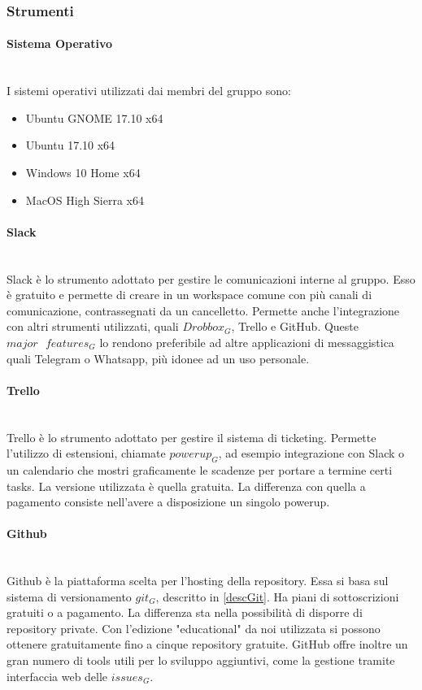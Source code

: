 	\subsubsection{Strumenti}
		\paragraph{Sistema Operativo} \mbox{} \\
		I sistemi operativi utilizzati dai membri del gruppo sono:
		\begin{itemize}
			\item Ubuntu GNOME 17.10 x64
			\item Ubuntu 17.10 x64
			\item Windows 10 Home x64
			\item MacOS High Sierra x64
		\end{itemize}
		
		\paragraph{Slack}\mbox{} \\
		Slack è lo strumento adottato per gestire le comunicazioni interne al gruppo. Esso è gratuito e permette di creare in un workspace comune con più canali di comunicazione, contrassegnati da un cancelletto. Permette anche l'integrazione con altri strumenti utilizzati, quali $Drobbox_G$, Trello e GitHub. Queste $major\text{ }features_G$ lo rendono preferibile ad altre applicazioni di messaggistica quali Telegram o Whatsapp, più idonee ad un uso personale. 
		
		\paragraph{Trello} \mbox{} \\
		Trello è lo strumento adottato per gestire il sistema di ticketing. Permette l'utilizzo di estensioni, chiamate $powerup_G$, ad esempio integrazione con Slack o un calendario che mostri graficamente le scadenze per portare a termine certi tasks. La versione utilizzata è quella gratuita. La differenza con quella a pagamento consiste nell'avere a disposizione un singolo powerup.
		
		\paragraph{Github} \mbox{} \\
		Github è la piattaforma scelta per l'hosting della repository. Essa si basa sul sistema di versionamento $git_G$, descritto in \ref{descGit}. Ha piani di sottoscrizioni gratuiti o a pagamento. La differenza sta nella possibilità di disporre di repository private. Con l'edizione "educational" da noi utilizzata si possono ottenere gratuitamente fino a cinque repository gratuite. GitHub offre inoltre un gran numero di tools utili per lo sviluppo aggiuntivi, come la gestione tramite interfaccia web delle $issues_G$.
		
